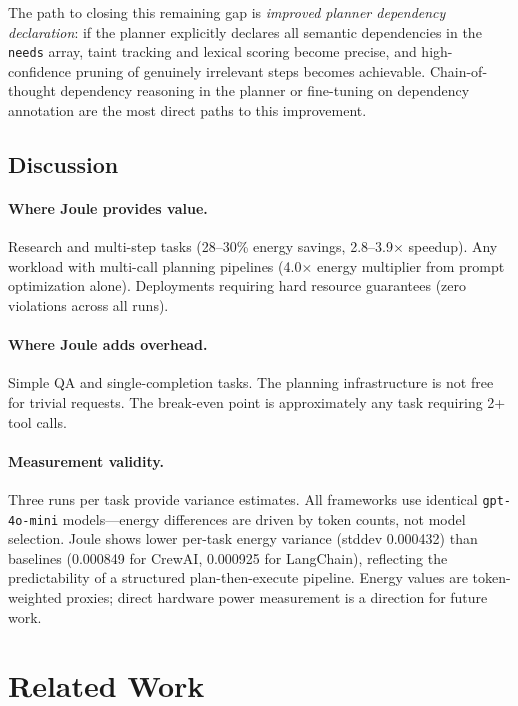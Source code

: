 \documentclass[sigconf,authordraft]{acmart}
\begin{document}
The path to closing this remaining gap is \emph{improved planner dependency declaration}: if the planner explicitly declares all semantic dependencies in the \texttt{needs} array, taint tracking and lexical scoring become precise, and high-confidence pruning of genuinely irrelevant steps becomes achievable.
Chain-of-thought dependency reasoning in the planner or fine-tuning on dependency annotation are the most direct paths to this improvement.



\subsection{Discussion}
\label{sec:discussion}

\paragraph{Where Joule provides value.}
Research and multi-step tasks (28--30\% energy savings, 2.8--3.9$\times$ speedup).
Any workload with multi-call planning pipelines (4.0$\times$ energy multiplier from prompt optimization alone).
Deployments requiring hard resource guarantees (zero violations across all runs).

\paragraph{Where Joule adds overhead.}
Simple QA and single-completion tasks.
The planning infrastructure is not free for trivial requests.
The break-even point is approximately any task requiring 2+ tool calls.

\paragraph{Measurement validity.}
Three runs per task provide variance estimates.
All frameworks use identical \texttt{gpt-4o-mini} models---energy differences are driven by token counts, not model selection.
Joule shows lower per-task energy variance (stddev 0.000432) than baselines (0.000849 for CrewAI, 0.000925 for LangChain), reflecting the predictability of a structured plan-then-execute pipeline.
Energy values are token-weighted proxies; direct hardware power measurement is a direction for future work.

\section{Related Work}
\label{sec:related}
\end{document}
